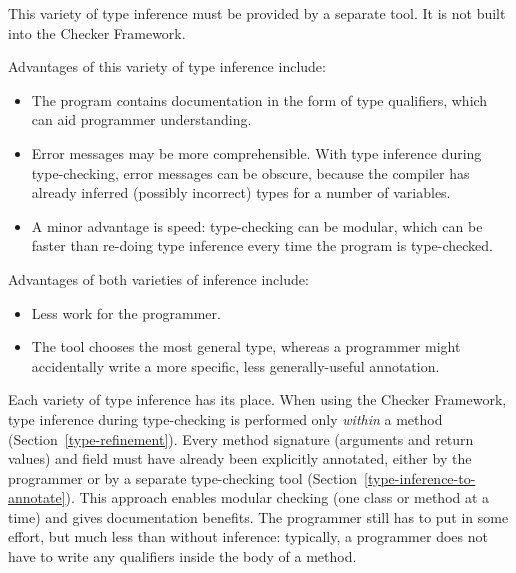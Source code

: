 \begin{enumerate}
  This variety of type inference must be provided by a separate tool.  It
  is not built into the Checker Framework.

  Advantages of this variety of type inference include:
  \begin{itemize}
  \item
    The program contains documentation in the form of type qualifiers,
    which can aid programmer understanding.
  \item
    Error messages may be more comprehensible.  With type inference
    during type-checking, error messages can be obscure, because the
    compiler has already inferred (possibly incorrect) types for a number
    of variables.
  \item
    A minor advantage is speed:  type-checking can be modular, which can be
    faster than re-doing type inference every time the
    program is type-checked.
  \end{itemize}

\end{enumerate}

Advantages of both varieties of inference include:
\begin{itemize}
\item
  Less work for the programmer.
\item
  The tool chooses the most general type, whereas a programmer might
  accidentally write a more specific, less generally-useful annotation.
\end{itemize}


Each variety of type inference has its place.  When using the Checker
Framework, type inference during type-checking is performed only
\emph{within} a method (Section~\ref{type-refinement}).  Every method
signature (arguments and return values) and field must have already been explicitly annotated,
either by the programmer or by a separate type-checking tool
(Section~\ref{type-inference-to-annotate}).
This approach enables modular checking (one class or method at a time) and
gives documentation benefits.
The programmer still has to
put in some effort, but much less than without inference:  typically, a
programmer does not have to write any qualifiers
inside the body of a method.


